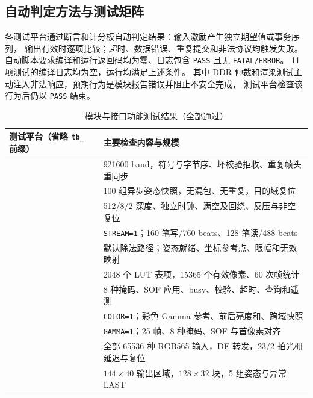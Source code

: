 \subsection{自动判定方法与测试矩阵}
各测试平台通过断言和计分板自动判定结果：输入激励产生独立期望值或事务序列，
输出有效时逐项比较；超时、数据错误、重复提交和非法协议均触发失败。
自动脚本要求编译和运行返回码均为零、日志包含 \texttt{PASS} 且无
\texttt{FATAL/ERROR}。 11 项测试的编译日志均为空，运行均满足上述条件。
其中 DDR 仲裁和渲染测试主动注入非法响应，预期行为是模块报告错误并阻止不安全完成，
测试平台检查该行为后仍以 \texttt{PASS} 结束。

\begin{table}[htbp]\centering\small
\caption{模块与接口功能测试结果（全部通过）}\label{tab:sim-matrix}
\begin{tabularx}{\textwidth}{>{\raggedright\arraybackslash}p{4.5cm}Y}
\toprule
测试平台（省略 \texttt{tb\_} 前缀） & 主要检查内容与规模 \\
\midrule
{} & 921600 baud，符号与字节序、坏校验拒收、重复帧头重同步 \\
 & 100 组异步姿态快照，无混包、无重复，目的域复位 \\
 & 512/8/2 深度、独立时钟、满空及回绕、反压与非空复位 \\
 & \texttt{STREAM=1}；160 笔写/760 beats、128 笔读/488 beats \\
 & 默认除法路径；姿态就绪、坐标参考点、限幅和无效映射 \\
 & 2048 个 LUT 表项，15365 个有效像素、60 次帧统计 \\
 & 8 种掩码、SOF 应用、busy、校验、超时、查询和遥测 \\
 & \texttt{COLOR=1}；彩色 Gamma 参考、前后亮度和、跨域快照 \\
 & \texttt{GAMMA=1}；25 帧、8 种掩码、SOF 与首像素对齐 \\
 & 全部 65536 种 RGB565 输入，DE 转发，23/2 拍光栅延迟与复位 \\
 & $144\times40$ 输出区域，$128\times32$ 块，5 组姿态与异常 LAST \\
\bottomrule
\end{tabularx}
\end{table}

